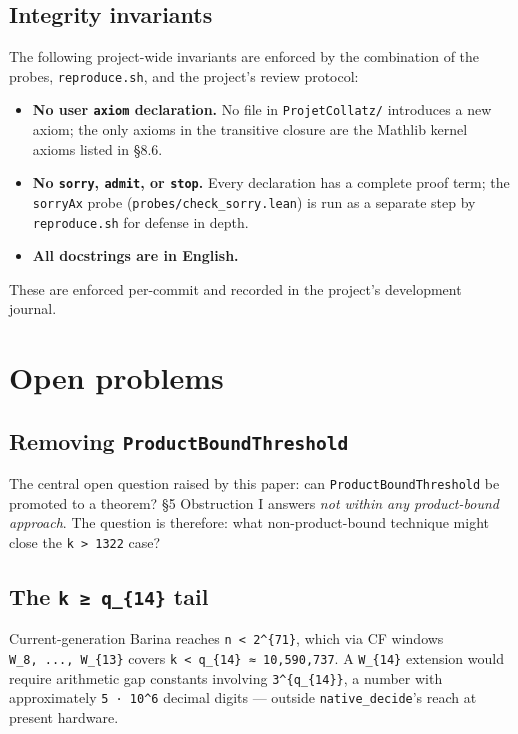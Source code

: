 \documentclass[
  11pt]{amsart}
\providecommand{\tightlist}{%
  \setlength{\itemsep}{0pt}\setlength{\parskip}{0pt}}
\theoremstyle{plain}
\theoremstyle{definition}
\theoremstyle{remark}
\begin{document}
\subsection{Integrity invariants}\label{integrity-invariants}

The following project-wide invariants are enforced by the combination of
the probes, \texttt{reproduce.sh}, and the project's review protocol:

\begin{itemize}
\tightlist
\item
  \textbf{No user \texttt{axiom} declaration.} No file in
  \texttt{ProjetCollatz/} introduces a new axiom; the only axioms in the
  transitive closure are the Mathlib kernel axioms listed in §8.6.
\item
  \textbf{No \texttt{sorry}, \texttt{admit}, or \texttt{stop}.} Every
  declaration has a complete proof term; the \texttt{sorryAx} probe
  (\texttt{probes/check\_sorry.lean}) is run as a separate step by
  \texttt{reproduce.sh} for defense in depth.
\item
  \textbf{All docstrings are in English.}
\end{itemize}

These are enforced per-commit and recorded in the project's development
journal.

\section{Open problems}\label{open-problems}

\subsection{\texorpdfstring{Removing
\texttt{ProductBoundThreshold}}{Removing ProductBoundThreshold}}\label{removing-productboundthreshold}

The central open question raised by this paper: can
\texttt{ProductBoundThreshold} be promoted to a theorem? §5 Obstruction
I answers \emph{not within any product-bound approach}. The question is
therefore: what non-product-bound technique might close the
\texttt{k\ \textgreater{}\ 1322} case?

\subsection{\texorpdfstring{The \texttt{k\ ≥\ q\_\{14\}}
tail}{The k ≥ q\_\{14\} tail}}\label{the-k-q_14-tail}

Current-generation Barina reaches \texttt{n\ \textless{}\ 2\^{}\{71\}},
which via CF windows \texttt{W\_8,\ ...,\ W\_\{13\}} covers
\texttt{k\ \textless{}\ q\_\{14\}\ ≈\ 10,590,737}. A \texttt{W\_\{14\}}
extension would require arithmetic gap constants involving
\texttt{3\^{}\{q\_\{14\}\}}, a number with approximately
\texttt{5\ ·\ 10\^{}6} decimal digits --- outside
\texttt{native\_decide}'s reach at present hardware.
\end{document}
